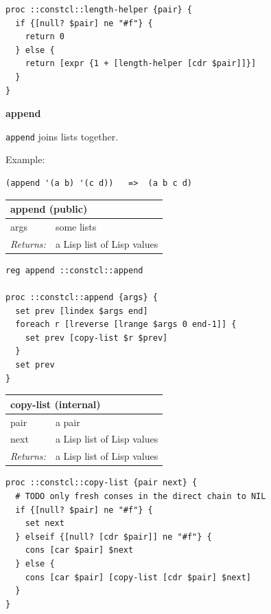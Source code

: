 \documentclass[twoside,9pt]{report}
\begin{document}
\noindent\makebox[\linewidth]{\rule{\linewidth}{0.4pt}}
\begin{lstlisting}
proc ::constcl::length-helper {pair} {
  if {[null? $pair] ne "#f"} {
    return 0
  } else {
    return [expr {1 + [length-helper [cdr $pair]]}]
  }
}
\end{lstlisting}
\noindent\makebox[\linewidth]{\rule{\linewidth}{0.4pt}}

\textbf{append}


\texttt{append} joins lists together.


Example:

\noindent\makebox[\linewidth]{\rule{\linewidth}{0.4pt}}
\begin{lstlisting}
(append '(a b) '(c d))   =>  (a b c d)
\end{lstlisting}
\noindent\makebox[\linewidth]{\rule{\linewidth}{0.4pt}}
\begin{tabular}{ |l l| }
\hline
\multicolumn{2}{|l|}{append (public)} \\
\hline
args & some lists \\
\textit{Returns:} & a Lisp list of Lisp values \\
\hline
\end{tabular}

\noindent\makebox[\linewidth]{\rule{\linewidth}{0.4pt}}
\begin{lstlisting}
reg append ::constcl::append
 
proc ::constcl::append {args} {
  set prev [lindex $args end]
  foreach r [lreverse [lrange $args 0 end-1]] {
    set prev [copy-list $r $prev]
  }
  set prev
}
\end{lstlisting}
\noindent\makebox[\linewidth]{\rule{\linewidth}{0.4pt}}
\begin{tabular}{ |l l| }
\hline
\multicolumn{2}{|l|}{copy-list (internal)} \\
\hline
pair & a pair \\
next & a Lisp list of Lisp values \\
\textit{Returns:} & a Lisp list of Lisp values \\
\hline
\end{tabular}

\noindent\makebox[\linewidth]{\rule{\linewidth}{0.4pt}}
\begin{lstlisting}
proc ::constcl::copy-list {pair next} {
  # TODO only fresh conses in the direct chain to NIL
  if {[null? $pair] ne "#f"} {
    set next
  } elseif {[null? [cdr $pair]] ne "#f"} {
    cons [car $pair] $next
  } else {
    cons [car $pair] [copy-list [cdr $pair] $next]
  }
}
\end{lstlisting}
\noindent\makebox[\linewidth]{\rule{\linewidth}{0.4pt}}
\end{document}
